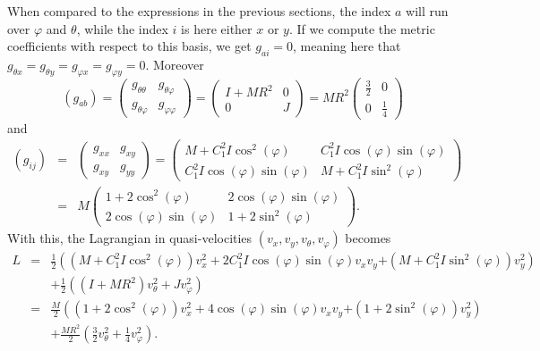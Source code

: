 \documentclass[11pt]{article}
\def\I{I}
\def\J{J}
\def\m{M}
\def\Ra{R}
\def\ce{C_1}
\begin{document}
 
When compared to the expressions in the previous sections, the index $a$ will run over $\varphi$ and $\theta$, while the index $i$ is here either $x$ or $y$. If we compute the metric coefficients with respect to this basis, we get $g_{ai}=0$, meaning here that $g_{\theta x} = g_{\theta y} = g_{\varphi x}= g_{\varphi y}= 0$. Moreover 
\[
(g_{ab}) = \begin{pmatrix} g_{\theta \theta} & g_{\theta\varphi} \\ g_{\theta\varphi} & g_{\varphi \varphi} \end{pmatrix}  = \begin{pmatrix} \I+\m\Ra^2     & 0 \\ 0 & \J    \end{pmatrix} = MR^2\begin{pmatrix}  \frac{3}{2}    & 0 \\ 0 &     \frac{1}{4}   \end{pmatrix}
\]
and
\begin{eqnarray*}
(g_{ij}) &=& \begin{pmatrix} g_{xx} & g_{xy} \\ g_{xy} & g_{yy} \end{pmatrix} = \begin{pmatrix} \m+\ce^2\I\cos^2(\varphi) & \ce^2\I\cos(\varphi)\sin(\varphi) \\ \ce^2\I\cos(\varphi)\sin(\varphi)  & \m+\ce^2\I\sin^2(\varphi) \end{pmatrix} \\&=&  M\begin{pmatrix} 1+2 \cos^2(\varphi) & 2 \cos(\varphi)\sin(\varphi) \\ 2 \cos(\varphi)\sin(\varphi)  & 1+2 \sin^2(\varphi) \end{pmatrix}.
\end{eqnarray*}
With this, the Lagrangian in quasi-velocities $(v_x, v_y, v_\theta, v_\varphi)$ becomes
\begin{eqnarray*}
L&=&\frac{1}{2}\left(\left(\m+\ce^2\I\cos^2(\varphi)\right) v_x^2+2 \ce^2\I\cos (\varphi) \sin(\varphi) v_x v_y\right. 
\left.+\left(\m+\ce^2\I\sin^2(\varphi)\right) v_y^2\right) \\&& +\frac{1}{2}\left((\I+\m\Ra^2) v_\theta^2+\J v_{\varphi}^2\right) 
\\&=&
\frac{M}{2}\left(\left(1+2 \cos^2(\varphi)\right) v_x^2+4 \cos (\varphi) \sin(\varphi) v_x v_y\right. 
\left.+\left(1+2 \sin^2(\varphi)\right) v_y^2\right)\\&&+ \frac{MR^2}{2}\left(\frac{3}{2} v_\theta^2+\frac{1}{4} v_{\varphi}^2\right).
\end{eqnarray*}
\end{document}

